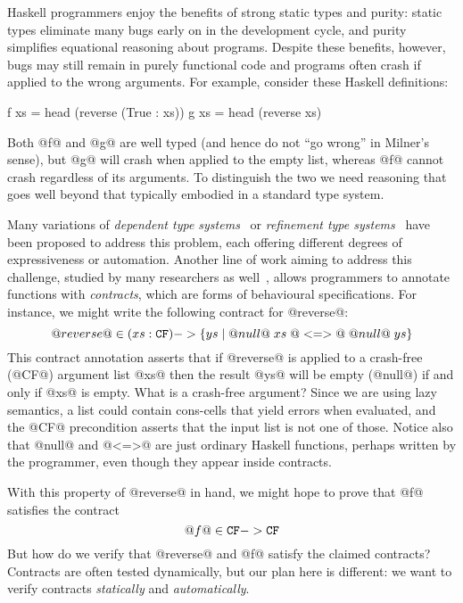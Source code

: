 Haskell programmers enjoy the benefits of strong static types and purity:
static types eliminate many bugs early on in the development cycle, and purity
simplifies equational reasoning about programs. Despite these benefits, however,
bugs may still remain in purely functional code and programs often
crash if applied to the wrong arguments.
For example, consider these Haskell definitions:
\begin{code}
  f xs = head (reverse (True : xs))
  g xs = head (reverse xs)
\end{code}
Both @f@ and @g@ are well typed (and hence do not ``go wrong'' in Milner's
sense), but @g@ will crash when applied to the empty list, whereas @f@
cannot crash regardless of its arguments.
To distinguish the two we need reasoning that goes well beyond
that typically embodied in a standard type system.

Many variations of {\em dependent type systems}~\cite{norell:thesis,Xi:2007:DMA:1230756.1230759,fstar} or
{\em refinement type systems}~\cite{Rondon:2008:LT:1375581.1375602,Knowles+:sage}
have been proposed to address this problem, each offering different degrees of
expressiveness or automation.
Another line of work aiming to address this challenge, studied by many researchers
as well~\cite{Findler:2002:CHF:581478.581484,Blume:2006:SCM:1166013.1166016,Knowles+:sage,Siek06gradualtyping,Wadler:2009:WPC:1532974.1532976}, allows programmers to annotate
functions with {\em contracts}, which are forms of behavioural specifications.
For instance, we might write the following contract for
@reverse@:
\[ @reverse@ \in (xs : {\tt CF}) -> \{ ys \mid @null@\;xs\; @<=>@\; @null@\;ys \}  \]
This contract annotation asserts that if @reverse@ is applied to a
crash-free (@CF@) argument list @xs@ then the result @ys@ will be empty (@null@)
if and only if @xs@ is empty. What is a crash-free argument?
Since we are using lazy semantics, a list could contain cons-cells that yield
errors when evaluated, and the @CF@ precondition asserts that the input list
is not one of those.
Notice also that @null@ and @<=>@ are just ordinary Haskell functions, perhaps
written by the programmer, even though they appear inside contracts.

With this property of @reverse@ in hand, we might
hope to prove that @f@ satisfies the contract
\[ @f@ \in {\tt CF} -> {\tt CF} \]
But how do we verify that @reverse@ and @f@ satisfy the claimed
contracts? Contracts are often tested dynamically, but
our plan here is different: we want to verify contracts \emph{statically}
and \emph{automatically}.

